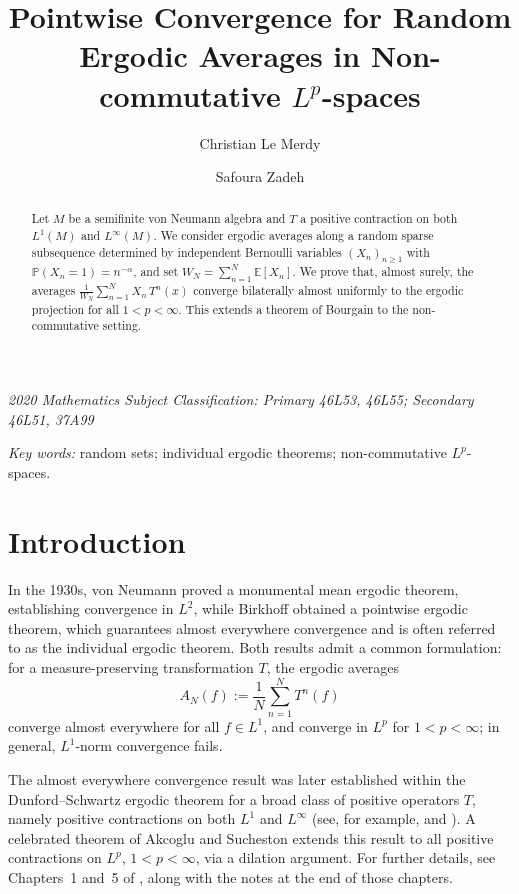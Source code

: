 \documentclass[12pt]{amsart}
\author[C. Le Merdy]{Christian Le Merdy}
\author[S. Zadeh]{Safoura Zadeh}
\theoremstyle{remark}
\theoremstyle{definition}
\numberwithin{equation}{section}
\begin{document}
\title[Random ergodic averages]{Pointwise Convergence for Random Ergodic 
Averages in Non-commutative \(L^p\)-spaces}



\begin{abstract} 
 Let \(M\) be a semifinite von Neumann algebra and \(T\) a positive contraction on both \(L^1(M)\) and \(L^\infty(M)\). We consider ergodic averages along a random sparse subsequence determined by independent Bernoulli variables \((X_n)_{n\geq 1}\) with \(\mathbb{P}(X_n = 1) = n^{-\alpha}\), and set \(W_N = \sum_{n=1}^N \mathbb{E}[X_n]\). We prove that, almost surely, the averages  \(\frac{1}{W_N} \sum_{n=1}^N X_n\, T^n(x)\) converge bilaterally almost uniformly to the ergodic projection for all \(1 < p < \infty\). This extends a theorem of Bourgain to the non-commutative setting.
\end{abstract}

\maketitle


\noindent
{\it 2020 Mathematics Subject Classification: Primary 46L53, 46L55; Secondary 46L51, 37A99}


\smallskip
\noindent
{\it Key words:}  random sets; individual ergodic theorems; non-commutative \(L^p\)-spaces.






\bigskip
\section{Introduction}\label{1}

In the 1930s, von Neumann proved a monumental mean ergodic theorem, establishing convergence in \(L^2\), while Birkhoff obtained a pointwise ergodic theorem, which guarantees almost everywhere convergence and is often referred to as the individual ergodic theorem. Both results admit a common formulation: for a measure-preserving transformation \(T\), the ergodic averages
\[
A_N(f) := \frac{1}{N}\sum_{n=1}^{N} T^n(f)
\]
converge almost everywhere for all \(f \in L^1\), and converge in \(L^p\) for \(1 < p < \infty\); in general, \(L^1\)-norm convergence fails.
\smallskip

The almost everywhere convergence result was later established within the Dunford--Schwartz ergodic theorem for a broad class of positive operators \(T\), namely positive contractions on both \(L^1\) and \(L^\infty\) (see, for example, \cite[Section 3, Theorem 6]{DS} and \cite[Section 11.1]{EFHN}). A celebrated theorem of Akcoglu and Sucheston \cite{AS} extends this result to all positive contractions on \(L^p\), \(1 < p < \infty\), via a dilation argument. For further details, see Chapters~1 and~5 of \cite{Kren}, along with the notes at the end of those chapters. 
\end{document}
